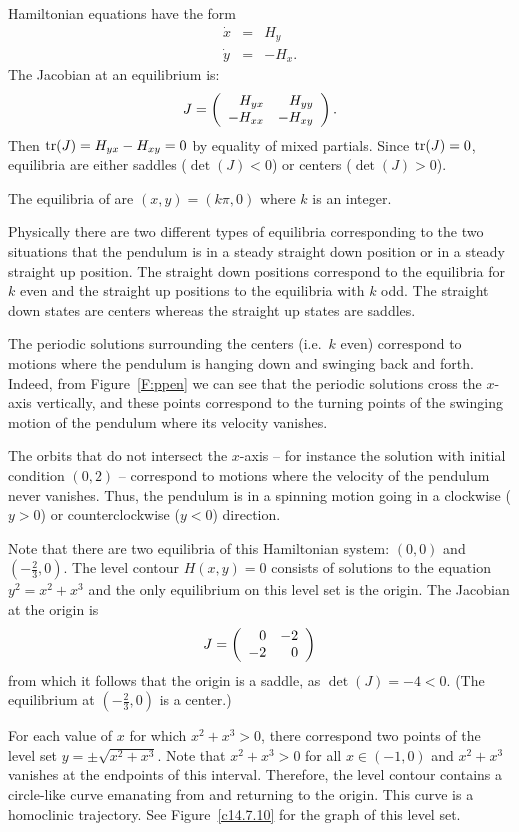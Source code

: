 \documentclass{ximera}
\begin{document}
\soln  Hamiltonian equations have the form 
\begin{eqnarray*}
\dot{x} & = & H_y \\
\dot{y} & = & -H_x.
\end{eqnarray*}
The Jacobian at an equilibrium is:
\[
J = \left(\begin{array}{rr} H_{yx} & H_{yy}\\ -H_{xx} &-H_{xy}\end{array}\right).
\]
Then ${\rm tr}(J)=H_{yx}-H_{xy}=0$ by equality of mixed partials.  Since 
${\rm tr}(J)=0$, equilibria are either saddles ($\det(J)<0$) or centers
($\det(J)>0$).



 \ans The equilibria of  are
$(x,y)=(k\pi,0)$ where $k$ is an integer.

\soln Physically there are two different types of equilibria corresponding
to the two situations that the pendulum is in a steady straight down
position or in a steady straight up position.  The straight down
positions correspond to the equilibria for $k$ even and the straight
up positions to the equilibria with $k$ odd.  The straight down
states are centers whereas the straight up states are saddles.

The periodic solutions surrounding the centers (i.e.\ $k$ even) correspond to 
motions where the pendulum is hanging down and swinging back and forth.
Indeed, from Figure~\ref{F:ppen} we can see that the periodic solutions
cross the $x$-axis vertically, and these points correspond to the turning
points of the swinging motion of the pendulum where its velocity vanishes.

The orbits that do not intersect the $x$-axis -- for instance the
solution with initial condition $(0,2)$ -- correspond to motions where
the velocity of the pendulum never vanishes.  Thus, the pendulum is
in a spinning motion going in a clockwise ($y>0$) or counterclockwise
($y<0$) direction.



Note that there are two equilibria of this Hamiltonian system: $(0,0)$ and
$(-\frac{2}{3},0)$.  The level contour $H(x,y)=0$ consists of solutions to 
the equation $y^2=x^2+x^3$ and the only equilibrium on this level set is the
origin.  The Jacobian at the origin is
\[
J = \left(\begin{array}{rr} 0 & -2\\ -2 &0\end{array}\right)
\]
from which it follows that the origin is a saddle, as $\det(J)=-4<0$. (The
equilibrium at $(-\frac{2}{3},0)$ is a center.)

For each value of $x$ for which $x^2+x^3>0$, there correspond two points of
the level set $y=\pm\sqrt{x^2+x^3}$.  Note that $x^2+x^3>0$ for all 
$x\in(-1,0)$ and $x^2+x^3$ vanishes at the endpoints of this interval. 
Therefore, the level contour contains a circle-like curve emanating from and
returning to the origin.  This curve is a homoclinic trajectory.  See
Figure~\ref{c14.7.10} for the graph of this level set.
 
\end{document}
